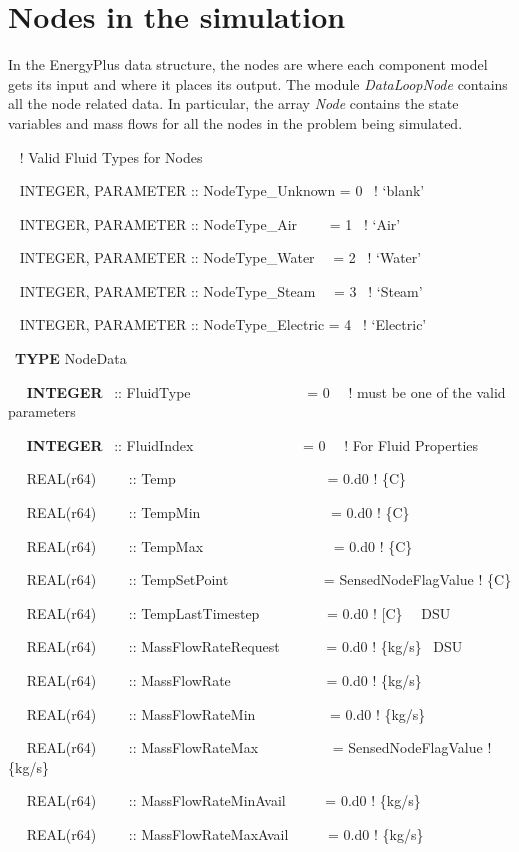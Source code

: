\section{Nodes in the simulation}\label{nodes-in-the-simulation}

In the EnergyPlus data structure, the nodes are where each component model gets its input and where it places its output. The module \emph{DataLoopNode} contains all the node related data. In particular, the array \emph{Node} contains the state variables and mass flows for all the nodes in the problem being simulated.

~ ! Valid Fluid Types for Nodes

~ INTEGER, PARAMETER :: NodeType\_Unknown = 0~ ! `blank'

~ INTEGER, PARAMETER :: NodeType\_Air~~~~ = 1~ ! `Air'

~ INTEGER, PARAMETER :: NodeType\_Water~~ = 2~ ! `Water'

~ INTEGER, PARAMETER :: NodeType\_Steam~~ = 3~ ! `Steam'

~ INTEGER, PARAMETER :: NodeType\_Electric = 4~ ! `Electric'

~\textbf{TYPE} NodeData

~~ \textbf{INTEGER}~ :: FluidType~~~~~~~~~~~~~~~~ = 0~~ ! must be one of the valid parameters

~~ \textbf{INTEGER}~ :: FluidIndex~~~~~~~~~~~~~~~ = 0~~ ! For Fluid Properties

~~ REAL(r64)~~~~ :: Temp~~~~~~~~~~~~~~~~~~~~~ = 0.d0 ! \{C\}

~~ REAL(r64)~~~~ :: TempMin~~~~~~~~~~~~~~~~~~ = 0.d0 ! \{C\}

~~ REAL(r64)~~~~ :: TempMax~~~~~~~~~~~~~~~~~~ = 0.d0 ! \{C\}

~~ REAL(r64)~~~~ :: TempSetPoint~~~~~~~~~~~~~ = SensedNodeFlagValue ! \{C\}

~~ REAL(r64)~~~~ :: TempLastTimestep~~~~~~~~~ = 0.d0 ! {[}C\}~~ DSU

~~ REAL(r64)~~~~ :: MassFlowRateRequest~~~~~~ = 0.d0 ! \{kg/s\}~ DSU

~~ REAL(r64)~~~~ :: MassFlowRate~~~~~~~~~~~~~ = 0.d0 ! \{kg/s\}

~~ REAL(r64)~~~~ :: MassFlowRateMin~~~~~~~~~~ = 0.d0 ! \{kg/s\}

~~ REAL(r64)~~~~ :: MassFlowRateMax~~~~~~~~~~ = SensedNodeFlagValue ! \{kg/s\}

~~ REAL(r64)~~~~ :: MassFlowRateMinAvail~~~~~ = 0.d0 ! \{kg/s\}

~~ REAL(r64)~~~~ :: MassFlowRateMaxAvail~~~~~ = 0.d0 ! \{kg/s\}

